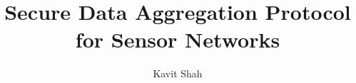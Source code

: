 \documentclass[ece,dissertation]{class/puthesis}
\title{%
  Secure Data Aggregation Protocol for Sensor Networks%
}
\author{Kavit Shah}{Shah, Kavit}
\begin{document}
\volume












% 






%
%
%
%
%
%


%
\end{document}
